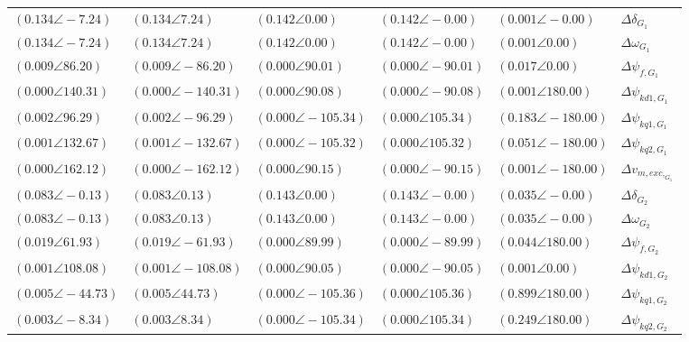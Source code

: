 \begin{tabular}{lllll|l}
$\mathbf{(0.134 \angle -7.24)}$	& $\mathbf{(0.134 \angle 7.24)}$	& $\mathbf{(0.142 \angle 0.00)}$	& $\mathbf{(0.142 \angle -0.00)}$	& $(0.001 \angle -0.00)$	& $\Delta\delta_{G_1}$ \\ 
$\mathbf{(0.134 \angle -7.24)}$	& $\mathbf{(0.134 \angle 7.24)}$	& $\mathbf{(0.142 \angle 0.00)}$	& $\mathbf{(0.142 \angle -0.00)}$	& $(0.001 \angle 0.00)$	& $\Delta\omega_{G_1}$ \\ 
$(0.009 \angle 86.20)$	& $(0.009 \angle -86.20)$	& $(0.000 \angle 90.01)$	& $(0.000 \angle -90.01)$	& $(0.017 \angle 0.00)$	& $\Delta \psi_{f,G_1}$ \\ 
$(0.000 \angle 140.31)$	& $(0.000 \angle -140.31)$	& $(0.000 \angle 90.08)$	& $(0.000 \angle -90.08)$	& $(0.001 \angle 180.00)$	& $\Delta \psi_{kd1,G_1}$ \\ 
$(0.002 \angle 96.29)$	& $(0.002 \angle -96.29)$	& $(0.000 \angle -105.34)$	& $(0.000 \angle 105.34)$	& $\mathbf{(0.183 \angle -180.00)}$	& $\Delta \psi_{kq1,G_1}$ \\ 
$(0.001 \angle 132.67)$	& $(0.001 \angle -132.67)$	& $(0.000 \angle -105.32)$	& $(0.000 \angle 105.32)$	& $\mathbf{(0.051 \angle -180.00)}$	& $\Delta \psi_{kq2,G_1}$ \\ 
$(0.000 \angle 162.12)$	& $(0.000 \angle -162.12)$	& $(0.000 \angle 90.15)$	& $(0.000 \angle -90.15)$	& $(0.001 \angle -180.00)$	& $\Delta v_{m,exc,_{G_1}}$ \\ 
 \hline 
$\mathbf{(0.083 \angle -0.13)}$	& $\mathbf{(0.083 \angle 0.13)}$	& $\mathbf{(0.143 \angle 0.00)}$	& $\mathbf{(0.143 \angle -0.00)}$	& $(0.035 \angle -0.00)$	& $\Delta\delta_{G_2}$ \\ 
$\mathbf{(0.083 \angle -0.13)}$	& $\mathbf{(0.083 \angle 0.13)}$	& $\mathbf{(0.143 \angle 0.00)}$	& $\mathbf{(0.143 \angle -0.00)}$	& $(0.035 \angle -0.00)$	& $\Delta\omega_{G_2}$ \\ 
$(0.019 \angle 61.93)$	& $(0.019 \angle -61.93)$	& $(0.000 \angle 89.99)$	& $(0.000 \angle -89.99)$	& $(0.044 \angle 180.00)$	& $\Delta \psi_{f,G_2}$ \\ 
$(0.001 \angle 108.08)$	& $(0.001 \angle -108.08)$	& $(0.000 \angle 90.05)$	& $(0.000 \angle -90.05)$	& $(0.001 \angle 0.00)$	& $\Delta \psi_{kd1,G_2}$ \\ 
$(0.005 \angle -44.73)$	& $(0.005 \angle 44.73)$	& $(0.000 \angle -105.36)$	& $(0.000 \angle 105.36)$	& $\mathbf{(0.899 \angle 180.00)}$	& $\Delta \psi_{kq1,G_2}$ \\ 
$(0.003 \angle -8.34)$	& $(0.003 \angle 8.34)$	& $(0.000 \angle -105.34)$	& $(0.000 \angle 105.34)$	& $\mathbf{(0.249 \angle 180.00)}$	& $\Delta \psi_{kq2,G_2}$ \\ 

\end{tabular}
